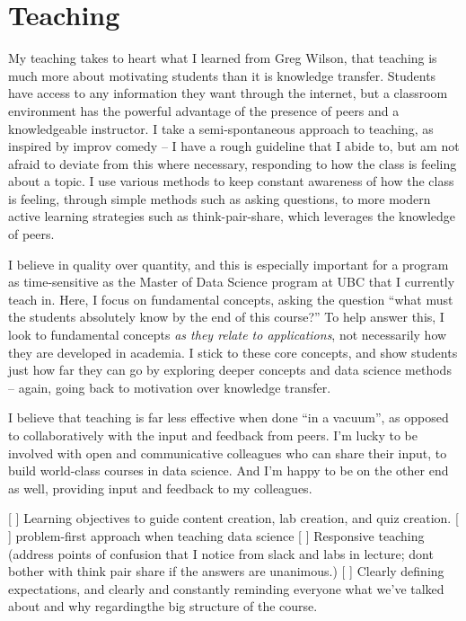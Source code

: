 \documentclass[]{book}
\begin{document}
\hypertarget{teaching}{%
\section{Teaching}\label{teaching}}

My teaching takes to heart what I learned from Greg Wilson, that teaching is much more about motivating students than it is knowledge transfer. Students have access to any information they want through the internet, but a classroom environment has the powerful advantage of the presence of peers and a knowledgeable instructor. I take a semi-spontaneous approach to teaching, as inspired by improv comedy -- I have a rough guideline that I abide to, but am not afraid to deviate from this where necessary, responding to how the class is feeling about a topic. I use various methods to keep constant awareness of how the class is feeling, through simple methods such as asking questions, to more modern active learning strategies such as think-pair-share, which leverages the knowledge of peers.

I believe in quality over quantity, and this is especially important for a program as time-sensitive as the Master of Data Science program at UBC that I currently teach in. Here, I focus on fundamental concepts, asking the question ``what must the students absolutely know by the end of this course?'' To help answer this, I look to fundamental concepts \emph{as they relate to applications}, not necessarily how they are developed in academia. I stick to these core concepts, and show students just how far they can go by exploring deeper concepts and data science methods -- again, going back to motivation over knowledge transfer.

I believe that teaching is far less effective when done ``in a vacuum'', as opposed to collaboratively with the input and feedback from peers. I'm lucky to be involved with open and communicative colleagues who can share their input, to build world-class courses in data science. And I'm happy to be on the other end as well, providing input and feedback to my colleagues.

{[} {]} Learning objectives to guide content creation, lab creation, and quiz creation.
{[} {]} problem-first approach when teaching data science
{[} {]} Responsive teaching (address points of confusion that I notice from slack and labs in lecture; dont bother with think pair share if the answers are unanimous.)
{[} {]} Clearly defining expectations, and clearly and constantly reminding everyone what we've talked about and why regardingthe big structure of the course.
\end{document}
